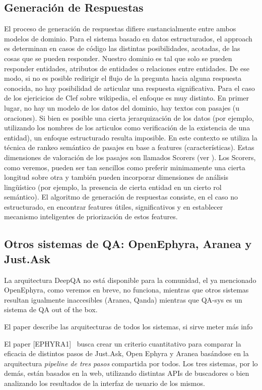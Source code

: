 \subsection{Generación de Respuestas}
El proceso de generación de respuestas difiere sustancialmente entre ambos modelos de dominio. Para el sistema basado en datos estructurados, el approach es determinan en casos de código las distintas posibilidades, acotadas, de las cosas que se pueden responder. Nuestro dominio es tal que solo se pueden responder entidades, atributos de entidades o relaciones entre entidades. De ese modo, si no es posible redirigir el flujo de la pregunta hacia alguna respuesta conocida, no hay posibilidad de articular una respuesta significativa. Para el caso de los ejericicios de Clef sobre wikipedia, el enfoque es muy distinto. En primer lugar, no hay un modelo de los datos del dominio, hay textos con pasajes (u oraciones). Si bien es posible una cierta jerarquización de los datos (por ejemplo, utilizando los nombres de los articulos como verificación de la existencia de una entidad), un enfoque estructurado resulta imposible. En este contexto se utiliza la técnica de rankeo semántico de pasajes en base a features (características). Estas dimensiones de valoración de los pasajes son llamados Scorers (ver ). Los Scorers, como veremos, pueden ser tan sencillos como preferir minimamente una cierta longitud sobre otra y también pueden incorporar dimensiones de análisis lingüístico (por ejemplo, la presencia de cierta entidad en un cierto rol semántico). El algoritmo de generación de respuestas consiste, en el caso no estructurado, en encontrar features útiles, significativos y en establecer mecanismo inteligentes de priorización de estos features.

\subsection{Otros sistemas de QA: OpenEphyra, Aranea y Just.Ask}
\label{subsec:otros-sistemas}
\bigskip

La arquitectura DeepQA no está disponible para la comunidad, el ya mencionado OpenEphyra, como veremos en breve, no funciona, mientras que otros sistemas resultan igualmente inaccesibles (Aranea, Qanda) mientras que QA-sys es un sistema de QA out of the box.
\bigskip


El paper describe las arquitecturas de todos los sistemas, si sirve
meter más info

El paper [EPHYRA1] \ busca crear un criterio cuantitativo para comparar
la eficacia de distintos pasos de Just.Ask, Open Ephyra y Aranea
basándose en la arquitectura \textit{pipeline de tres pasos}
compartida por todos. Los tres sistemas, por lo demás, están
basados en la web, utilizando distintas APIs de buscadores o bien
analizando los resultados de la interfaz de usuario de los mismos. 

